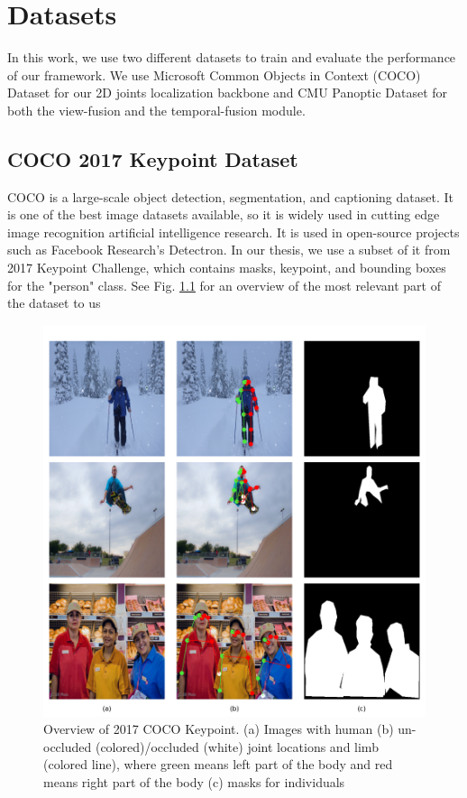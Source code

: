 \chapter{Datasets}\label{chapter:dataset}
In this work, we use two different datasets to train and evaluate the performance of our framework. We use Microsoft Common Objects in Context (COCO) Dataset \cite{coco} for our 2D joints localization backbone and CMU Panoptic Dataset \cite{cmu-panoptic} for both the view-fusion and the temporal-fusion module.
\section{COCO 2017 Keypoint Dataset}
COCO is a large-scale object detection, segmentation, and captioning dataset. It is one of the best image datasets available, so it is widely used in cutting edge image recognition artificial intelligence research. It is used in open-source projects such as Facebook Research's Detectron. In our thesis, we use a subset of it from 2017 Keypoint Challenge, which contains masks, keypoint, and bounding boxes for the "person" class. See Fig. \ref{fig:ch5-coco-overview} for an overview of the most relevant part of the dataset to us
\begin{figure}
	\centering
	\includegraphics[width=1.0\columnwidth]{figures/ch5/coco-overview.png}
	\caption{Overview of 2017 COCO Keypoint. (a) Images with human (b) un-occluded (colored)/occluded (white) joint locations and limb (colored line), where green means left part of the body and red means right part of the body (c) masks for individuals} 
	\label{fig:ch5-coco-overview}
\end{figure}
